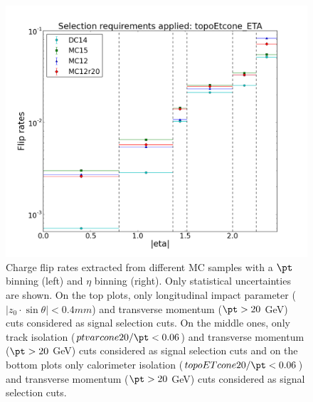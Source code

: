 \begin{figure}[!htbp]
\includegraphics[width=0.4\linewidth]{FIGURES/BKG/chargeFlip/APPENDIX/fliprates_eta_topoEtcone_ETA.png}
\caption{\label{fig:ptcone} Charge flip rates extracted from different MC samples with a $\pt$ binning (left) and $\eta$ binning (right). Only statistical uncertainties are shown. On the top plots, only longitudinal impact parameter ($\left | z_0 \cdot \sin{\theta} \right |<0.4 mm $) and transverse momentum ($\pt>20$ GeV) cuts considered as signal selection cuts. On the middle ones, only track isolation ($ptvarcone20/\pt<0.06$) and transverse momentum ($\pt>20$ GeV) cuts considered as signal selection cuts and on the bottom plots only calorimeter isolation ($topoETcone20/\pt<0.06$) and transverse momentum ($\pt>20$ GeV) cuts considered as signal selection cuts.}
\end{figure}
